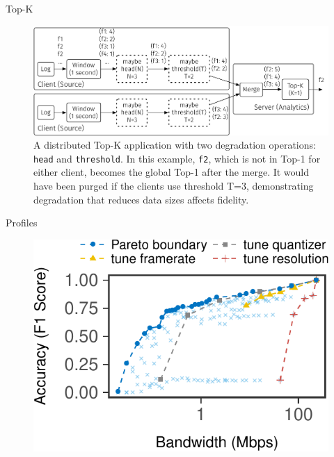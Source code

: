 \begin{frame}{Top-K}
  \begin{figure}
    \centering
    \includegraphics[width=\columnwidth]{figures/topk.pdf}
    \caption{A distributed Top-K application with two degradation operations:
      \texttt{head} and \texttt{threshold}. In this example, \texttt{f2}, which
      is not in Top-1 for either client, becomes the global Top-1 after the
      merge. It would have been purged if the clients use threshold T=3,
      demonstrating degradation that reduces data sizes affects fidelity.}
    \label{fig:topk}
    \vspace{-0.5em}
  \end{figure}
\end{frame}

\begin{frame}{Profiles}
  \begin{figure}
    \includegraphics[width=\linewidth]{figures/profile-mot.pdf}
  \end{figure}
\end{frame}


